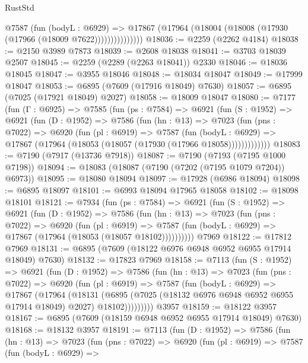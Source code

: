 \begin{lexlean}{RustStd}
\begin{coremodule}
                  @7587
                    (fun (bodyL : @6929) =>
                    @17867 (@17964 (@18004 (@18008 (@17930 (@17966 (@18009 @7622)))))))))))))))
@18036 := @2259 (@2262 @4184)
@18038 := @2150 @3989 @7873
@18039 := @2608 @18038
@18041 := @3703 @18039 @2507
@18045 := @2259 (@2289 (@2263 @18041)) @2330
@18046 := @18036 @18045
@18047 := @3955 @18046
@18048 := @18034 @18047
@18049 := @17999 @18047
@18053 := @6895 (@7609 (@17916 @18049) @7630)
@18057 := @6895 (@7025 (@17921 @18049) @2027)
@18058 := @18009 @18047
@18080 := @7177
    (fun (Γ : @6925) =>
    @7585
      (fun (ps : @7584) =>
      @6921
        (fun (S : @1952) =>
        @6921
          (fun (D : @1952) =>
          @7586
            (fun (hn : @13) =>
            @7023
              (fun (pns : @7022) =>
              @6920
                (fun (pl : @6919) =>
                @7587
                  (fun (bodyL : @6929) =>
                  @17867 (@17964 (@18053 (@18057 (@17930 (@17966 @18058)))))))))))))
@18083 := @7190 (@7917 (@13736 @7918))
@18087 := @7190 (@7193 (@7195 @1000 @7198))
@18094 := @18083 (@18087 (@7190 (@7202 (@7195 @1079 @7204)) @6973))
@18095 := @18080 @18094
@18097 := @17928 (@6986 @18094)
@18098 := @6895 @18097
@18101 := @6993 @18094 @17965 @18058
@18102 := @18098 @18101
@18121 := @7934
    (fun (ps : @7584) =>
    @6921
      (fun (S : @1952) =>
      @6921
        (fun (D : @1952) =>
        @7586
          (fun (hn : @13) =>
          @7023
            (fun (pns : @7022) =>
            @6920
              (fun (pl : @6919) =>
              @7587 (fun (bodyL : @6929) => @17867 (@17964 (@18053 (@18057 @18102))))))))))
    @7969
@18122 := @17812 @7969
@18131 := @6895 (@7609 (@18122 @6976 @6948 @6952 @6955 @17914 @18049) @7630)
@18132 := @17823 @7969
@18158 := @7113
    (fun (S : @1952) =>
    @6921
      (fun (D : @1952) =>
      @7586
        (fun (hn : @13) =>
        @7023
          (fun (pns : @7022) =>
          @6920
            (fun (pl : @6919) =>
            @7587
              (fun (bodyL : @6929) =>
              @17867
                (@17964
                  (@18131
                    (@6895
                      (@7025 (@18132 @6976 @6948 @6952 @6955 @17914 @18049) @2027)
                      @18102)))))))))
    @3957
@18159 := @18122 @3957
@18167 := @6895 (@7609 (@18159 @6948 @6952 @6955 @17914 @18049) @7630)
@18168 := @18132 @3957
@18191 := @7113
    (fun (D : @1952) =>
    @7586
      (fun (hn : @13) =>
      @7023
        (fun (pns : @7022) =>
        @6920
          (fun (pl : @6919) =>
          @7587
            (fun (bodyL : @6929) =>

\end{coremodule}
\end{lexlean}

